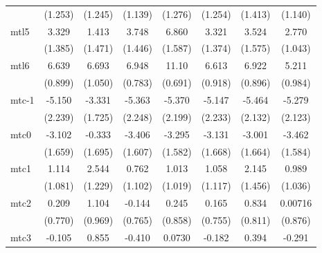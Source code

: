 \documentclass{article}
\begin{document}
{\begin{longtable}{l*{7}{c}}
                &  (1.253)         &  (1.245)         &  (1.139)         &  (1.276)         &  (1.254)         &  (1.413)         &  (1.140)         \\
mtl5            &    3.329\sym{*}  &    1.413         &    3.748\sym{*}  &    6.860\sym{***}&    3.321\sym{*}  &    3.524\sym{*}  &    2.770\sym{*}  \\
                &  (1.385)         &  (1.471)         &  (1.446)         &  (1.587)         &  (1.374)         &  (1.575)         &  (1.043)         \\
mtl6            &    6.639\sym{***}&    6.693\sym{***}&    6.948\sym{***}&    11.10\sym{***}&    6.613\sym{***}&    6.922\sym{***}&    5.211\sym{***}\\
                &  (0.899)         &  (1.050)         &  (0.783)         &  (0.691)         &  (0.918)         &  (0.896)         &  (0.984)         \\
mtc-1           &   -5.150\sym{*}  &   -3.331         &   -5.363\sym{*}  &   -5.370\sym{*}  &   -5.147\sym{*}  &   -5.464\sym{*}  &   -5.279\sym{*}  \\
                &  (2.239)         &  (1.725)         &  (2.248)         &  (2.199)         &  (2.233)         &  (2.132)         &  (2.123)         \\
mtc0            &   -3.102         &   -0.333         &   -3.406\sym{*}  &   -3.295\sym{*}  &   -3.131         &   -3.001         &   -3.462\sym{*}  \\
                &  (1.659)         &  (1.695)         &  (1.607)         &  (1.582)         &  (1.668)         &  (1.664)         &  (1.584)         \\
mtc1            &    1.114         &    2.544\sym{*}  &    0.762         &    1.013         &    1.058         &    2.145         &    0.989         \\
                &  (1.081)         &  (1.229)         &  (1.102)         &  (1.019)         &  (1.117)         &  (1.456)         &  (1.036)         \\
mtc2            &    0.209         &    1.104         &   -0.144         &    0.245         &    0.165         &    0.834         &  0.00716         \\
                &  (0.770)         &  (0.969)         &  (0.765)         &  (0.858)         &  (0.755)         &  (0.811)         &  (0.876)         \\
mtc3            &   -0.105         &    0.855         &   -0.410         &   0.0730         &   -0.182         &    0.394         &   -0.291         \\

\end{longtable}}
\end{document}
